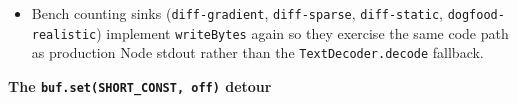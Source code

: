 \begin{itemize}
  \texttt{b\allowbreak{}i\allowbreak{}j\allowbreak{}o\allowbreak{}u\allowbreak{}-\allowbreak{}t\allowbreak{}u\allowbreak{}i} runtime \texttt{O\allowbreak{}U\allowbreak{}T\allowbreak{}B\allowbreak{}U\allowbreak{}F\allowbreak{}\_\allowbreak{}B\allowbreak{}Y\allowbreak{}T\allowbreak{}E\allowbreak{}S\allowbreak{}\_\allowbreak{}P\allowbreak{}E\allowbreak{}R\allowbreak{}\_\allowbreak{}C\allowbreak{}E\allowbreak{}L\allowbreak{}L} bumped from 64 → 96 with \texttt{O\allowbreak{}U\allowbreak{}T\allowbreak{}B\allowbreak{}U\allowbreak{}F\allowbreak{}\_\allowbreak{}S\allowbreak{}L\allowbreak{}A\allowbreak{}C\allowbreak{}K} 4096 → 8192, matching the differ's \texttt{S\allowbreak{}C\allowbreak{}R\allowbreak{}A\allowbreak{}T\allowbreak{}C\allowbreak{}H\allowbreak{}\_\allowbreak{}B\allowbreak{}Y\allowbreak{}T\allowbreak{}E\allowbreak{}S\allowbreak{}\_\allowbreak{}P\allowbreak{}E\allowbreak{}R\allowbreak{}\_\allowbreak{}C\allowbreak{}E\allowbreak{}L\allowbreak{}L} budget for worst-case-per-cell direct emission.
\item
  Bench counting sinks (\texttt{d\allowbreak{}i\allowbreak{}f\allowbreak{}f\allowbreak{}-\allowbreak{}g\allowbreak{}r\allowbreak{}a\allowbreak{}d\allowbreak{}i\allowbreak{}e\allowbreak{}n\allowbreak{}t}, \texttt{d\allowbreak{}i\allowbreak{}f\allowbreak{}f\allowbreak{}-\allowbreak{}s\allowbreak{}p\allowbreak{}a\allowbreak{}r\allowbreak{}s\allowbreak{}e}, \texttt{d\allowbreak{}i\allowbreak{}f\allowbreak{}f\allowbreak{}-\allowbreak{}s\allowbreak{}t\allowbreak{}a\allowbreak{}t\allowbreak{}i\allowbreak{}c}, \texttt{d\allowbreak{}o\allowbreak{}g\allowbreak{}f\allowbreak{}o\allowbreak{}o\allowbreak{}d\allowbreak{}-\allowbreak{}r\allowbreak{}e\allowbreak{}a\allowbreak{}l\allowbreak{}i\allowbreak{}s\allowbreak{}t\allowbreak{}i\allowbreak{}c}) implement \texttt{w\allowbreak{}r\allowbreak{}i\allowbreak{}t\allowbreak{}e\allowbreak{}B\allowbreak{}y\allowbreak{}t\allowbreak{}e\allowbreak{}s} again so they exercise the same code path as production Node stdout rather than the \texttt{T\allowbreak{}e\allowbreak{}x\allowbreak{}t\allowbreak{}D\allowbreak{}e\allowbreak{}c\allowbreak{}o\allowbreak{}d\allowbreak{}e\allowbreak{}r\allowbreak{}.\allowbreak{}d\allowbreak{}e\allowbreak{}c\allowbreak{}o\allowbreak{}d\allowbreak{}e} fallback.
\end{itemize}

\textbf{The \texttt{b\allowbreak{}u\allowbreak{}f\allowbreak{}.\allowbreak{}s\allowbreak{}e\allowbreak{}t\allowbreak{}(\allowbreak{}S\allowbreak{}H\allowbreak{}O\allowbreak{}R\allowbreak{}T\allowbreak{}\_\allowbreak{}C\allowbreak{}O\allowbreak{}N\allowbreak{}S\allowbreak{}T\allowbreak{},\allowbreak{} \allowbreak{}o\allowbreak{}f\allowbreak{}f\allowbreak{})} detour}

